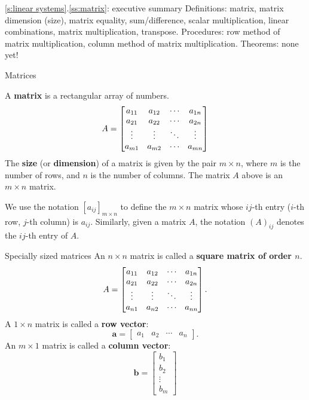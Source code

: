 \begin{frame}{\ref{s:linear systems}.\ref{ss:matrix}: executive summary}\footnotesize
\alert{Definitions}: matrix, matrix dimension (size), matrix equality, sum/difference, scalar multiplication, linear combinations, matrix multiplication, transpose.
\bspace
\alert{Procedures}: row method of matrix multiplication, column method of matrix multiplication. 
\bspace
\alert{Theorems}: none yet!
\end{frame}
\begin{frame}{Matrices}
\begin{definition}
A {\bf matrix} is a rectangular array of numbers. 
\[
A=\begin{bmatrix} a_{11} & a_{12} & \cdots & a_{1n} \\ a_{21} & a_{22} & \cdots & a_{2n} \\ \vdots & \vdots & \ddots & \vdots \\ a_{m1} & a_{m2} & \cdots & a_{mn} \end{bmatrix}
\]
The {\bf size} (or {\bf dimension}) of a matrix is given by the pair $m\times n$, where $m$ is the number of rows, and $n$ is the number of columns. The matrix $A$ above is an $m\times n$ matrix. 
\end{definition}
\pause
\begin{notation} We use the notation $[a_{ij}]_{m\times n}$ to define the $m\times n$ matrix whose $ij$-th entry ($i$-th {\color{red} row}, $j$-th {\color{blue} column}) is $a_{ij}$. 
\bpause Similarly, given a matrix $A$, the notation $(A)_{ij}$ denotes the $ij$-th entry of $A$.
\end{notation}

\end{frame}
\begin{frame}{Specially sized matrices}
An $n\times n$ matrix is called a {\bf square matrix of order $n$}. 
\[
A=\begin{bmatrix} a_{11} & a_{12} & \cdots & a_{1n} \\ a_{21} & a_{22} & \cdots & a_{2n} \\ \vdots & \vdots & \ddots & \vdots \\ a_{n 1} & a_{n 2} & \cdots & a_{n n} \end{bmatrix}.
\]
\pause
A $1\times n$ matrix is called a {\bf row vector}:
\[
\mathbf{a}=\begin{bmatrix} a_1&a_2&\cdots &a_n \end{bmatrix} .
\]
\pause
An $m\times 1$ matrix is called a {\bf column vector}:
\[
\mathbf{b}=\begin{bmatrix}b_1\\ b_2\\\vdots \\ b_m \end{bmatrix}
\]
\end{frame}
